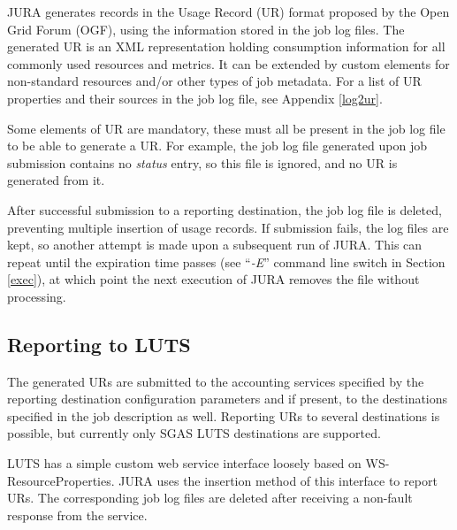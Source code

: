 \documentclass{article}                            %
\begin{document}

JURA generates records in the Usage Record (UR) format\cite{ur}
proposed by the Open Grid Forum (OGF), using the information stored in
the job log files. The generated UR is an XML representation holding
consumption information for all commonly used resources and
metrics. It can be extended by custom elements for non-standard
resources and/or other types of job metadata. For a list of UR
properties and their sources in the job log file, see Appendix
\ref{log2ur}.

Some elements of UR are mandatory, these must all be present in the
job log file to be able to generate a UR. For example, the job log
file generated upon job submission contains no \textit{status} entry,
so this file is ignored, and no UR is generated from it.

After successful submission to a reporting destination, the job log
file is deleted, preventing multiple insertion of usage records. If
submission fails, the log files are kept, so another attempt is made
upon a subsequent run of JURA. This can repeat until the expiration
time passes (see ``\textit{-E}'' command line switch in Section
\ref{exec}), at which point the next execution of JURA removes the
file without processing.




\subsection{Reporting to LUTS}
\label{accessing}
The generated URs are submitted to the accounting services specified
by the reporting destination configuration parameters and if present,
to the destinations specified in the job description as
well. Reporting URs to several destinations is possible, but currently
only SGAS LUTS destinations are supported.

LUTS has a simple custom web service interface loosely based on
WS-ResourceProperties\cite{wsrp}. JURA uses the insertion method of
this interface to report URs. The corresponding job log files are
deleted after receiving a non-fault response from the service.
\end{document}
